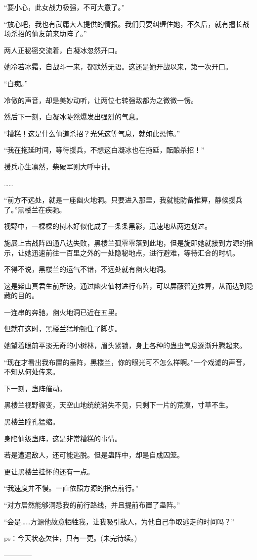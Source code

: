 \begin{this_body}
“要小心，此女战力极强，不可大意了。”

“放心吧，我也有武庸大人提供的情报。我们只要纠缠住她，不久后，就有擅长战场杀招的仙友前来助阵了。”

两人正秘密交流着，白凝冰忽然开口。

她冷若冰霜，自战斗一来，都默然无语。这还是她开战以来，第一次开口。

“白痴。”

冷傲的声音，却是美妙动听，让两位七转强敌都为之微微一愣。

然后下一刻，白凝冰陡然爆发出强烈的气息。

“糟糕！这是什么仙道杀招？光凭这等气息，就如此恐怖。”

“我在拖延时间，等待援兵，不想这白凝冰也在拖延，酝酿杀招！”

援兵心生凛然，柴破军则大呼中计。

……

“前方不远处，就是一座幽火地洞。只要进入那里，我就能防备推算，静候援兵了。”黑楼兰在疾驰。

视野中，一棵棵的树木好似化成了一条条黑影，迅速地从两边划过。

施展上古战阵四通八达失败，黑楼兰孤零零落到此地，但是旋即她就接到方源的指示，让她迅速前往一百里之外的一处隐秘地点，进行避难，等待汇合的时机。

不得不说，黑楼兰的运气不错，不远处就有幽火地洞。

这是紫山真君生前所设，通过幽火仙材进行布阵，可以屏蔽智道推算，从而达到隐藏的目的。

一连串的奔驰，幽火地洞已近在五里。

但就在这时，黑楼兰猛地顿住了脚步。

她望着眼前平淡无奇的小树林，眉头紧锁，身上各种的蛊虫气息逐渐升腾起来。

“现在才看出我布置的蛊阵，黑楼兰，你的眼光可不怎么样啊。”一个戏谑的声音，不知从何处传来。

下一刻，蛊阵催动。

黑楼兰视野骤变，天空山地统统消失不见，只剩下一片的荒漠，寸草不生。

黑楼兰瞳孔猛缩。

身陷仙级蛊阵，这是非常糟糕的事情。

若是遭遇敌人，还可能逃脱。但是蛊阵中，却是自成囚笼。

更让黑楼兰挂怀的还有一点。

“我速度并不慢。一直依照方源的指点前行。”

“对方居然能够洞悉我的前行路线，并且提前布置了蛊阵。”

“会是……方源他故意牺牲我，让我吸引敌人，为他自己争取逃走的时间吗？”

ps：今天状态欠佳，只有一更。(未完待续。)

------------

\end{this_body}

